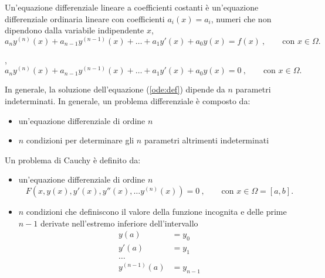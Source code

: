 \begin{definition} Un'equazione differenziale lineare a coefficienti costanti è un'equazione differenziale ordinaria lineare con coefficienti $a_i(x) = a_i$, numeri che non dipendono dalla variabile indipendente $x$,
\begin{equation}
    a_n y^{(n)}(x) + a_{n-1} y^{(n-1)}(x) + \dots + a_1 y'(x) + a_0 y(x) = f(x) \ , \qquad \text{con $x \in \Omega$}.
\end{equation}
\end{definition}
%
\begin{definition} \color{red}{Un'equazione differenziale lineare omogenea a coefficienti costanti è un'equazione differenziale ordinaria lineare a coefficienti costanti con $f(x) = 0$},
\begin{equation}
    a_n y^{(n)}(x) + a_{n-1} y^{(n-1)}(x) + \dots + a_1 y'(x) + a_0 y(x) = 0 \ , \qquad \text{con $x \in \Omega$}.
\end{equation}
\end{definition}
%
In generale, la soluzione dell'equazione (\ref{ode:def}) dipende da $n$ parametri indeterminati. In generale, un problema differenziale è composto da:
\begin{itemize}
    \item un'equazione differenziale di ordine $n$
    \item $n$ condizioni per determinare gli $n$ parametri altrimenti indeterminati
\end{itemize}

\begin{definition} Un problema di Cauchy è definito da:
\begin{itemize}
  \item un'equazione differenziale di ordine $n$
  \begin{equation}
     F\left(x,y(x),y'(x), y''(x), \dots y^{(n)}(x) \right) = 0 \ , \qquad \text{con $x \in \Omega = [a,b]$}.
  \end{equation}
  \item $n$ condizioni che definiscono il valore della funzione incognita e delle prime $n-1$ derivate nell'estremo inferiore dell'intervallo
  \begin{equation}
  \begin{aligned}
    y(a) & = y_0 \\
    y'(a) & = y_1 \\
    \dots \\
    y^{(n-1)}(a) & = y_{n-1} \\
  \end{aligned}
  \end{equation}
\end{itemize}

\end{definition}

